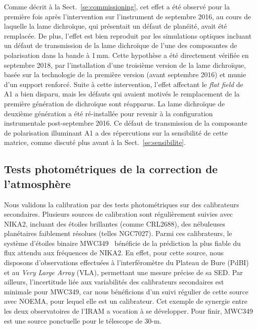 Comme décrit à la Sect.~\ref{se:commissioning}, cet effet a été
observé pour la première fois après l'intervention sur l'instrument de
septembre 2016, au cours de laquelle la lame dichroïque, qui
présentait un défaut de planéité, avait été remplacée. De plus,
l'effet est bien reproduit par les simulations optiques incluant
un défaut de transmission de la lame dichroïque de l'une des composantes de
polarisation dans la bande à 1\,mm. Cette hypothèse a été directement
vérifiée en septembre 2018, par l'installation d'une troisième version
de la lame dichroïque, basée sur la technologie de la première version
(avant septembre 2016) et munie d'un support renforcé. Suite à cette
intervention, l'effet affectant le \emph{flat field} de A1 a bien
disparu, mais les défauts qui avaient motivés le remplacement de la
première génération de dichroïque sont réapparus. La lame dichroïque
de deuxième génération a été ré-installée pour revenir à la
configuration instrumentale post-septembre 2016. Ce défaut
de transmission de la composante de polarisation illuminant A1 a des
répercutions sur la sensibilité de cette matrice, comme discuté plus
avant à la Sect.~\ref{se:sensibilite}.      


\subsection{Tests photométriques de la correction de l'atmosphère}
\label{se:corrected_skydip}

Nous validons la calibration par des tests photométriques sur des
calibrateurs secondaires. Plusieurs sources de calibration sont
régulièrement suivies avec NIKA2, incluant des étoiles brillantes
(comme CRL2688), des nébuleuses planétaires faiblement résolues
(telles NGC7027). Parmi ces calibrateurs, le système d'étoiles binaire
MWC349~\citep{Tafoya2004} bénéficie de la prédiction la plus fiable du
flux attendu aux fréquences de NIKA2. En effet, pour cette source,
nous disposons d'observations effectuées à l'interféromètre du Plateau
de Bure (PdBI) et au \emph{Very Large Array} (VLA), permettant une
mesure précise de sa SED. Par ailleurs, l'incertitude liée aux
variabilités des calibrateurs secondaires est minimale pour MWC349,
car nous bénéficions d'un suivi régulier de cette source avec NOEMA,
pour lequel elle est un calibrateur. Cet exemple de synergie entre les
deux observatoires de l'IRAM a vocation à se développer. Pour finir,
MWC349 est une source ponctuelle pour le télescope de 30-m.

